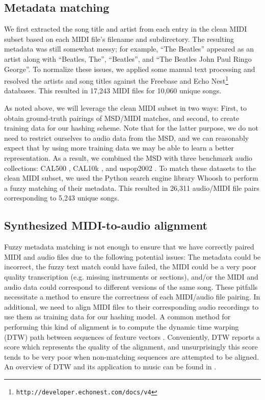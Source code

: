 \documentclass{article}
\begin{document}
\subsection{Metadata matching}

We first extracted the song title and artist from each entry in the clean MIDI subset based on each MIDI file's filename and subdirectory.
The resulting metadata was still somewhat messy; for example, ``The Beatles'' appeared as an artist along with ``Beatles, The'', ``Beatles'', and ``The Beatles John Paul Ringo George''.
To normalize these issues, we applied some manual text processing and resolved the artists and song titles against the Freebase \cite{bollacker2008freebase} and Echo Nest\footnote{\texttt{http://developer.echonest.com/docs/v4}} databases.
This resulted in 17,243 MIDI files for 10,060 unique songs.

As noted above, we will leverage the clean MIDI subset in two ways: First, to obtain ground-truth pairings of MSD/MIDI matches, and second, to create training data for our hashing scheme.
Note that for the latter purpose, we do not need to restrict ourselves to audio data from the MSD, and we can reasonably expect that by using more training data we may be able to learn a better representation.
As a result, we combined the MSD with three benchmark audio collections: CAL500 \cite{turnbull2007towards}, CAL10k \cite{tingle2010exploring}, and uspop2002 \cite{berenzweig2004large}.
To match these datasets to the clean MIDI subset, we used the Python search engine library Whoosh to perform a fuzzy matching of their metadata.
This resulted in 26,311 audio/MIDI file pairs corresponding to 5,243 unique songs.

\subsection{Synthesized MIDI-to-audio alignment}
\label{sec:alignment}

Fuzzy metadata matching is not enough to ensure that we have correctly paired MIDI and audio files due to the following potential issues: The metadata could be incorrect, the fuzzy text match could have failed, the MIDI could be a very poor quality transcription (e.g. missing instruments or sections), and/or the MIDI and audio data could correspond to different versions of the same song.
These pitfalls necessitate a method to ensure the correctness of each MIDI/audio file pairing.
In additional, we need to align MIDI files to their corresponding audio recordings to use them as training data for our hashing model.
A common method for performing this kind of alignment is to compute the dynamic time warping (DTW) path between sequences of feature vectors \cite{turetsky2003ground, hu2003polyphonic,ewert2012towards}.
Conveniently, DTW reports a score which represents the quality of the alignment, and unsurprisingly this score tends to be very poor when non-matching sequences are attempted to be aligned.
An overview of DTW and its application to music can be found in \cite{muller2007information}.
\end{document}

